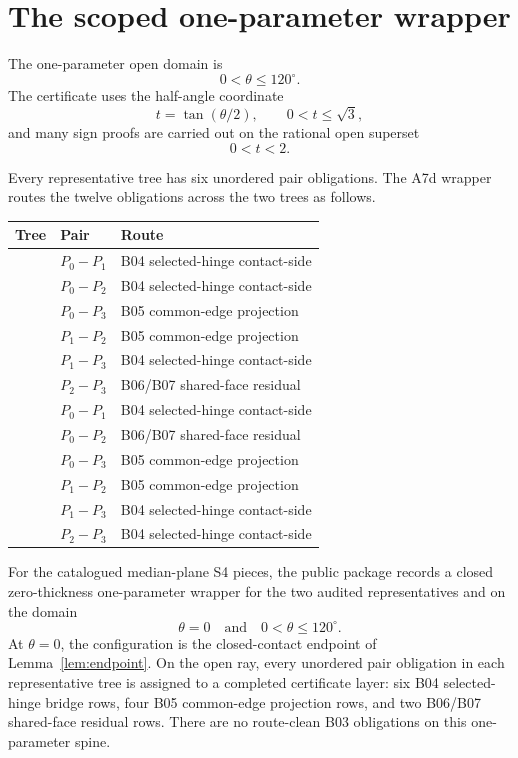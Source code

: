 \section{The scoped one-parameter wrapper}
\label{sec:wrapper}

The one-parameter open domain is
\[
0<\theta\le120^\circ.
\]
The certificate uses the half-angle coordinate
\[
t=\tan(\theta/2),\qquad 0<t\le\sqrt3,
\]
and many sign proofs are carried out on the rational open superset
\[
0<t<2.
\]

Every representative tree has six unordered pair obligations.  The A7d wrapper
routes the twelve obligations across the two trees as follows.
\begin{center}
\begin{tabular}{lll}
\toprule
Tree & Pair & Route\\
\midrule
\treeA{} & \(P_0-P_1\) & B04 selected-hinge contact-side\\
\treeA{} & \(P_0-P_2\) & B04 selected-hinge contact-side\\
\treeA{} & \(P_0-P_3\) & B05 common-edge projection\\
\treeA{} & \(P_1-P_2\) & B05 common-edge projection\\
\treeA{} & \(P_1-P_3\) & B04 selected-hinge contact-side\\
\treeA{} & \(P_2-P_3\) & B06/B07 shared-face residual\\
\midrule
\treeB{} & \(P_0-P_1\) & B04 selected-hinge contact-side\\
\treeB{} & \(P_0-P_2\) & B06/B07 shared-face residual\\
\treeB{} & \(P_0-P_3\) & B05 common-edge projection\\
\treeB{} & \(P_1-P_2\) & B05 common-edge projection\\
\treeB{} & \(P_1-P_3\) & B04 selected-hinge contact-side\\
\treeB{} & \(P_2-P_3\) & B04 selected-hinge contact-side\\
\bottomrule
\end{tabular}
\end{center}

\begin{theorem}
\label{thm:wrapper}
For the catalogued median-plane S4 pieces, the public package records a closed
zero-thickness one-parameter wrapper for the two audited representatives
\treeA{} and \treeB{} on the domain
\[
\theta=0\quad\text{and}\quad 0<\theta\le120^\circ.
\]
At \(\theta=0\), the configuration is the closed-contact endpoint of
Lemma~\ref{lem:endpoint}.  On the open ray, every unordered pair obligation in
each representative tree is assigned to a completed certificate layer: six B04
selected-hinge bridge rows, four B05 common-edge projection rows, and two
B06/B07 shared-face residual rows.  There are no route-clean B03 obligations on
this one-parameter spine.
\end{theorem}

